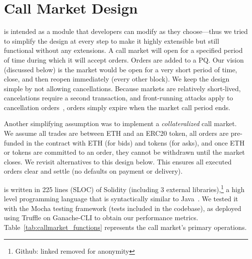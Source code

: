 
\section{Call Market Design}




\cm is intended as a module that developers can modify as they choose---thus we tried to simplify the design at every step to make it highly extensible but still functional without any extensions. A call market will open for a specified period of time during which it will accept orders. Orders are added to a PQ. Our vision (discussed below) is the market would be open for a very short period of time, close, and then reopen immediately (\eg every other block). We keep the design simple by not allowing cancellations. Because markets are relatively short-lived, cancelations require a second transaction, and front-running attacks apply to cancellation orders~\cite{eskandari2019sok}, orders simply expire when the market call period ends. 

Another simplifying assumption was to implement a \textit{collateralized} call market. We assume all trades are between ETH and an ERC20 token, all orders are pre-funded in the contract with ETH (for bids) and tokens (for asks), and once ETH or tokens are committed to an order, they cannot be withdrawn until the market closes. We revisit alternatives to this design below. This ensures all executed orders clear and settle (\ie no defaults on payment or delivery). 


\cm is written in 225 lines (SLOC) of Solidity (including 3 external libraries),\footnote{Github: linked removed for anonymity} a high level programming language that is syntactically similar to Java~\cite{Ethereum41:online}. We tested it with the Mocha testing framework (tests included in the codebase), as deployed using Truffle on Ganache-CLI to obtain our performance metrics. Table~\ref{tab:callmarket_functions} represents the call market's primary operations.


